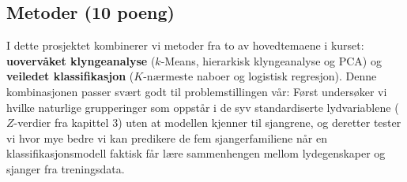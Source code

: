 \subsection{Metoder (10 poeng)}\label{metoder-10-poeng}


I dette prosjektet kombinerer vi metoder fra to av hovedtemaene i kurset: \textbf{uovervåket klyngeanalyse} ($k$-Means, hierarkisk klyngeanalyse og PCA) og \textbf{veiledet klassifikasjon} ($K$-nærmeste naboer og logistisk regresjon). Denne kombinasjonen passer svært godt til problemstillingen vår: Først undersøker vi hvilke naturlige grupperinger som oppstår i de syv standardiserte lydvariablene ($Z$-verdier fra kapittel 3) uten at modellen kjenner til sjangrene, og deretter tester vi hvor mye bedre vi kan predikere de fem sjangerfamiliene når en klassifikasjonsmodell faktisk får lære sammenhengen mellom lydegenskaper og sjanger fra treningsdata.

